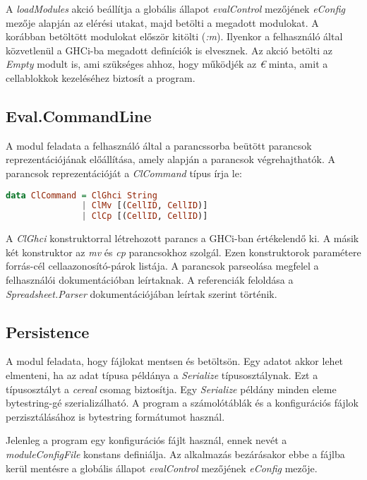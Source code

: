 A \textit{loadModules} akció beállítja a globális állapot \textit{evalControl} mezőjének \textit{eConfig} mezője alapján az elérési utakat, majd betölti a megadott modulokat. A korábban betöltött modulokat először kitölti (\textit{:m}). Ilyenkor a felhasználó által közvetlenül a GHCi-ba megadott definíciók is elvesznek. Az akció betölti az \textit{Empty} modult is, ami szükséges ahhoz, hogy működjék az \textit{€} minta, amit a cellablokkok kezeléséhez biztosít a program.

\subsection{Eval.CommandLine}

A modul feladata a felhasználó által a parancssorba beütött parancsok reprezentációjának előállítása, amely alapján a parancsok végrehajthatók. A parancsok reprezentációját a \textit{ClCommand} típus írja le:

\begin{lstlisting}[language={Haskell}]
data ClCommand = ClGhci String
               | ClMv [(CellID, CellID)]
               | ClCp [(CellID, CellID)]
\end{lstlisting}

A \textit{ClGhci} konstruktorral létrehozott parancs a GHCi-ban értékelendő ki. A másik két konstruktor az \textit{mv} és \textit{cp} parancsokhoz szolgál. Ezen konstruktorok paramétere forrás-cél cellaazonosító-párok listája. A parancsok parseolása megfelel a felhasználói dokumentációban leírtaknak. A referenciák feloldása a \textit{Spreadsheet.Parser} dokumentációjában leírtak szerint történik.

\subsection{Persistence}

A modul feladata, hogy fájlokat mentsen és betöltsön. Egy adatot akkor lehet elmenteni, ha az adat típusa példánya a \textit{Serialize} típusosztálynak. Ezt a típusosztályt a \textit{cereal} csomag biztosítja. Egy \textit{Serialize} példány minden eleme bytestring-gé szerializálható. A program a számolótáblák és a konfigurációs fájlok perzisztálásához is bytestring formátumot használ.

Jelenleg a program egy konfigurációs fájlt használ, ennek nevét a \textit{moduleConfigFile} konstans definiálja. Az alkalmazás bezárásakor ebbe a fájlba kerül mentésre a globális állapot \textit{evalControl} mezőjének \textit{eConfig} mezője.

